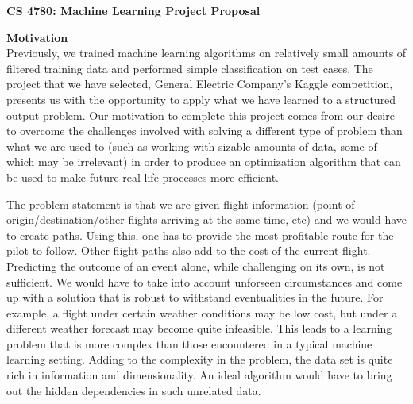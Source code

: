 \documentclass{article}[9pt]
\begin{document}
\begin{framed}
\noindent
\large{\textbf{CS 4780: Machine Learning \hfill Project Proposal}}
\end{framed}

\noindent\Large{\textbf{Motivation}}\\
\noindent Previously, we trained machine learning algorithms on relatively small amounts of filtered training data and performed simple classification on test cases. The project that we have selected, General Electric Company's Kaggle competition, presents us with the opportunity to apply what we have learned to a structured output problem. Our motivation to complete this project comes from our desire to overcome the challenges involved with solving a different type of problem than what we are used to (such as working with sizable amounts of data, some of which may be irrelevant) in order to produce an optimization algorithm that can be used to make future real-life processes more efficient.

The problem statement is that we are given flight information (point of origin/destination/other flights arriving at the same time, etc) and we would have to create paths. Using this, one has to provide the most profitable route for the pilot to follow. Other flight paths also add to the cost of the current flight. Predicting the outcome of an event alone, while challenging on its own, is not sufficient. We would have to take into account unforseen circumstances and come up with a solution that is robust to withstand eventualities in the future. For example, a flight under certain weather conditions may be low cost, but under a different weather forecast may become quite infeasible. This leads to a learning problem that is more complex than those encountered in a typical machine learning setting. Adding to the complexity in the problem, the data set is quite rich in information and dimensionality. An ideal algorithm would have to bring out the hidden dependencies in such unrelated data.
\end{document}
